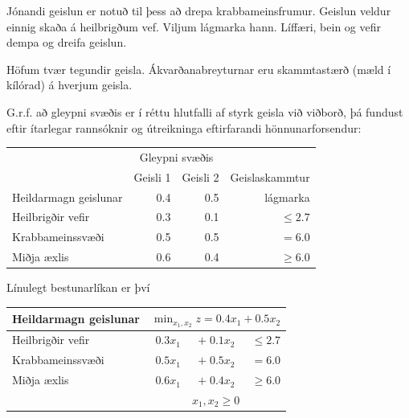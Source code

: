 \begin{daemi}\label{daemi:krabbi:grafisk}
Jónandi geislun er notuð til þess að drepa krabbameinsfrumur. Geislun veldur einnig skaða á heilbrigðum vef. Viljum lágmarka hann. Líffæri, bein og vefir dempa og dreifa geislun.

Höfum tvær tegundir geisla. Ákvarðanabreyturnar eru skammtastærð (mæld í kílórad) á hverjum geisla. 

G.r.f. að gleypni svæðis er í réttu hlutfalli af styrk geisla við viðborð, þá fundust eftir ítarlegar rannsóknir og útreikninga 
eftirfarandi hönnunar\-forsendur:

\begin{center}{\renewcommand{\arraystretch}{1.5} \renewcommand{\tabcolsep}{0.2cm}
\begin{tabular}{|l|rrr|}\hline
& \multicolumn{2}{c}{Gleypni svæðis} & \\
& Geisli 1 & Geisli 2 & Geislaskammtur \\\hline
Heildarmagn geislunar & 0.4 & 0.5 & lágmarka \\ 
Heilbrigðir vefir & 0.3 & 0.1 & $\leq 2.7 $ \\
Krabbameinssvæði & 0.5 & 0.5 & $=  6.0 $ \\
Miðja æxlis & 0.6 & 0.4 & $\ge 6.0$ \\ \hline
\end{tabular}} 
\end{center}

\end{daemi}
\begin{samepage}
\begin{lausn}Línulegt bestunarlíkan er því 
\begin{center}{\renewcommand{\arraystretch}{1.5} \renewcommand{\tabcolsep}{0.2cm}
\begin{tabular}{|l|rrr|}\hline
Heildarmagn geislunar & \multicolumn{3}{c|}{$\min_{x_1,x_2} z = 0.4x_1 + 0.5x_2$} \\ \hline
Heilbrigðir vefir & $0.3x_1$ & $+\; 0.1x_2$ & $ \le  2.7 $ \\
Krabbameinssvæði & $ 0.5x_1 $&$ +\; 0.5x_2 $&$=  6.0 $ \\
Miðja æxlis & $0.6x_1$&$ +\; 0.4x_2$& $\ge 6.0$ \\ 
& \multicolumn{3}{c|}{$x_1,x_2 \ge 0$} \\ \hline
\end{tabular}} 
\end{center}
\end{lausn}
\end{samepage}


